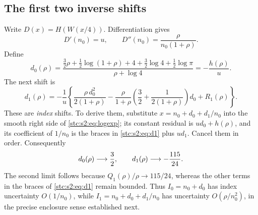 \documentclass[11pt,letterpaper]{article}
\numberwithin{equation}{section}
\theoremstyle{remark}\newtheorem{remark}[theorem]{Remark}
\begin{document}
\subsection{The first two inverse shifts}
Write $D(x)=H(W(x/4))$. Differentiation gives
\begin{equation}\label{stc:s2:eq:Dderivatives}
 D'(n_0)=u,\qquad D''(n_0)=\frac{\rho}{n_0(1+\rho)}.
\end{equation}
Define
\begin{equation}\label{stc:s2:eq:d0}
 d_0(\rho)=\frac{\frac32\rho+\frac12\log(1+\rho)+4+\frac32\log4+\frac12\log\pi}
 {\rho+\log4}=-\frac{h(\rho)}u.
\end{equation}
The next shift is
\begin{equation}\label{stc:s2:eq:d1}
 d_1(\rho)=-\frac1u\left\{
 \frac{\rho\,d_0^2}{2(1+\rho)}
 -\frac{\rho}{1+\rho}\left(\frac32+\frac1{2(1+\rho)}\right)d_0
 +R_1(\rho)\right\}.
\end{equation}
These are \emph{index} shifts. To derive them, substitute $x=n_0+d_0+d_1/n_0$ into the smooth right side of \eqref{stc:s2:eq:logexp}; its constant residual is $ud_0+h(\rho)$, and its coefficient of $1/n_0$ is the braces in \eqref{stc:s2:eq:d1} plus $ud_1$. Cancel them in order. Consequently
\begin{equation}\label{stc:s2:eq:shiftlimits}
 d_0(\rho)\longrightarrow\frac{3}{2},
 \qquad d_1(\rho)\longrightarrow-\frac{115}{24}.
\end{equation}
The second limit follows because $Q_1(\rho)/\rho\to115/24$, whereas the other terms in the braces of \eqref{stc:s2:eq:d1} remain bounded. Thus $I_0=n_0+d_0$ has index uncertainty $O(1/n_0)$, while $I_1=n_0+d_0+d_1/n_0$ has uncertainty $O(\rho/n_0^2)$, in the precise enclosure sense established next.
\end{document}

